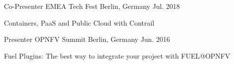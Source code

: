 

\begin{cventries}

  \cventry
    {Co-Presenter} %
    {EMEA Tech Fest} %
    {Berlin, Germany} %
    {Jul. 2018} %
    {
      \begin{cvitems} %
        \item {Containers, PaaS and Public Cloud with Contrail}
      \end{cvitems}
    }

  \cventry
    {Presenter} %
    {OPNFV Summit} %
    {Berlin, Germany} %
    {Jun. 2016} %
    {
      \begin{cvitems} %
        \item {Fuel Plugins: The best way to integrate your project with FUEL@OPNFV}
      \end{cvitems}
    }

\end{cventries}
